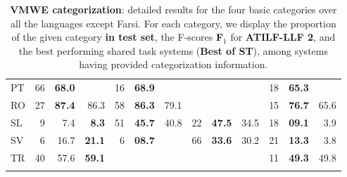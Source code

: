 \documentclass[output=paper,modfonts]{langscibook}
\begin{document}
\begin{table}[t]
\begin{tabular}{lrrrrrrrrrrrr}
PT & 66 & \textbf{68.0} &  				& 16 	& \textbf{68.9} &  				&  		&  				&  		& 18 	& \textbf{65.3} &  		\\
RO & 27 & \textbf{87.4} & 86.3 			& 58 	& \textbf{86.3} & 79.1 			&  		&  				&  		& 15 	& \textbf{76.7} & 65.6 	\\
SL & 9 	& 7.4 			& \textbf{8.3} 	& 51 	& \textbf{45.7} & 40.8 			& 22 	& \textbf{47.5} & 34.5  & 18 	& \textbf{09.1} & 3.9 	\\
SV & 6 	& 16.7 			& \textbf{21.1} & 6 	& \textbf{08.7} &  				& 66 	& \textbf{33.6} & 30.2  & 21 	& \textbf{13.3} & 3.8 	\\
TR & 40 & 57.6 			& \textbf{59.1} &  		&  				&  				&  		&  				&  		& 11 	& \textbf{49.3} & 49.8 \\\lspbottomrule
\end{tabular}
\caption{\textbf{VMWE categorization}: detailed results for the four basic categories over all the languages except Farsi. For each category, we display the proportion of the given category \textbf{in test set}, the F-scores \textbf{F$_1$} for \textbf{ATILF-LLF 2}, and the best performing shared task systems (\textbf{Best of ST}), among systems having provided categorization information.}
\label{tab:rescat}
\end{table}


\end{document}
